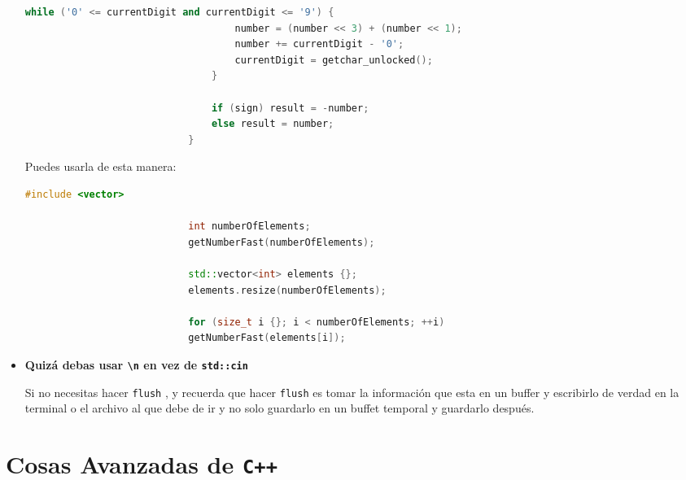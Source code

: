 \documentclass[12pt, fleqn]{report}                             %
\theoremstyle{break}                                            %
\newcommand{\textCode}[1]  { \texttt{#1} }                      %
\newcommand{\Cpp}{\ignorespaces\textCode{C++}}                  %
\begin{document}
\begin{itemize}
\begin{lstlisting}[language=C++, gobble=28]
                                while ('0' <= currentDigit and currentDigit <= '9') {          
                                    number = (number << 3) + (number << 1);
                                    number += currentDigit - '0';  
                                    currentDigit = getchar_unlocked();                             
                                }

                                if (sign) result = -number;
                                else result = number;
                            }
                        \end{lstlisting}

                        Puedes usarla de esta manera:
                        \begin{lstlisting}[language=C++, gobble=28]
                            #include <vector>

                            int numberOfElements;
                            getNumberFast(numberOfElements);

                            std::vector<int> elements {};
                            elements.resize(numberOfElements);

                            for (size_t i {}; i < numberOfElements; ++i) 
                            getNumberFast(elements[i]);
                        \end{lstlisting}

                    \item \textbf{Quizá debas usar \textCode{\textbackslash n} en vez de \textCode{std::cin}}
                        
                        Si no necesitas hacer 
                        \textCode{flush}, y recuerda que hacer \textCode{flush} es tomar la información que 
                        esta en un buffer y escribirlo de verdad en la terminal o el archivo al que debe de ir 
                        y no solo guardarlo en un buffet temporal y guardarlo después.
                \end{itemize}


    \clearpage
    \chapter{Cosas Avanzadas de \Cpp}
\end{document}

